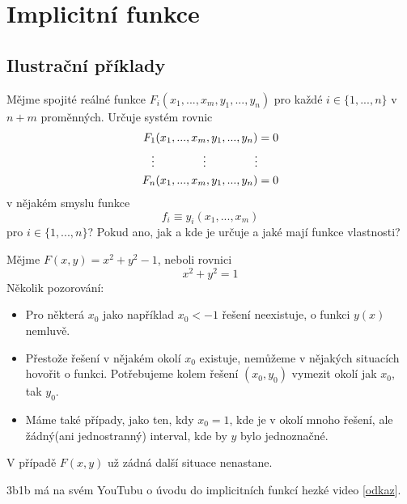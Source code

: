 \documentclass[../main.tex]{subfiles}
\begin{document}
\section{Implicitní funkce}

\subsection{Ilustrační příklady}

\begin{example}[Obecný]
	Mějme spojité reálné funkce $F_i(x_1, ... , x_m, y_1, ... , y_n)$ pro každé $i \in \{1, ..., n\}$
	v $n + m$
	proměnných. Určuje systém rovnic
	\[
		\begin{aligned}
			F_1(x_1, ... , x_m, y_1, ... , y_n) &= 0 \\
			\vdots \hspace{15mm} \vdots \hspace{15mm} \vdots \\
			F_n(x_1, ... , x_m, y_1, ... , y_n) &= 0
		\end{aligned}
\]
	v nějakém smyslu funkce
	\[ f_i \equiv y_i(x_1, ... , x_m) \]
	pro $i \in \{ 1, ... , n \}$? Pokud ano, jak a kde je určuje a jaké mají funkce vlastnosti?
\end{example}

\begin{example}[$F(x,y) = x^2 + y^2 - 1$]
	Mějme $F(x,y) = x^2 + y^2 - 1$, neboli rovnici \[ x^2 + y^2 = 1 \]
	Několik pozorování:
	\begin{itemize}
	    \item Pro některá $x_0$ jako například $x_0 < -1$ řešení neexistuje, o funkci $y(x)$ nemluvě.
	    \item Přestože řešení v nějakém okolí $x_0$ existuje, nemůžeme v nějakých situacích hovořit o funkci.
	    Potřebujeme kolem řešení $(x_0, y_0)$ vymezit okolí jak $x_0$, tak $y_0$.
	    \item Máme také případy, jako ten, kdy $x_0 = 1$, kde je v okolí mnoho řešení, ale žádný(ani
	    jednostranný) interval, kde by $y$ bylo jednoznačné.
	\end{itemize}
	V případě $F(x,y)$ už zádná další situace nenastane.
\end{example}

\begin{intuition}
	3b1b má na svém YouTubu o úvodu do implicitních funkcí hezké video [\href{https://www.youtube.com/watch?v=qb40J4N1fa4}{odkaz}].
\end{intuition}
\end{document}
